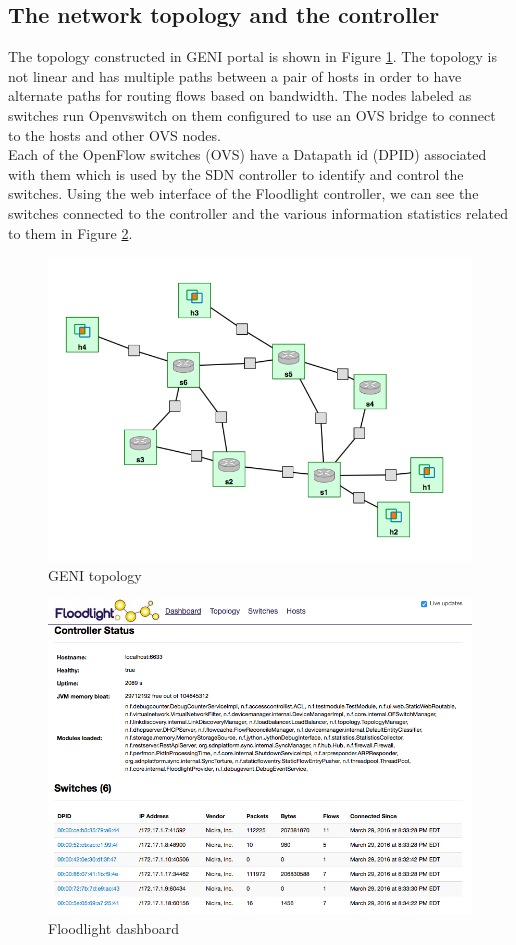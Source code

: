 \documentclass[paper=a4, fontsize=12pt]{scrartcl}	%
\numberwithin{equation}{section}		%
\numberwithin{figure}{section}			%
\numberwithin{table}{section}				%
\begin{document}
\subsection{The network topology and the controller}
The topology constructed in GENI portal is shown in Figure \ref{Fig 4.1}. The topology is not linear and has multiple paths between a pair of hosts in order to have alternate paths for routing flows based on bandwidth. The nodes labeled as switches run Openvswitch on them configured to use an OVS bridge to connect to the hosts and other OVS nodes.
\\
Each of the OpenFlow switches (OVS) have a Datapath id (DPID) associated with them which is used by the SDN controller to identify and control the switches. Using the web interface of the Floodlight controller, we can see the switches connected to the controller and the various information statistics related to them in Figure \ref{Fig 4.2}.
\begin{figure}[H]
\begin{center}
\includegraphics[scale=0.4]{topology.png}   
\end{center}
 \caption{GENI topology}
 \label{Fig 4.1}
\end{figure}
\begin{figure}[H]
\begin{center}
\includegraphics[scale=0.45]{floodlight.png}   
\end{center}
 \caption{Floodlight dashboard}
 \label{Fig 4.2}
\end{figure}
\end{document}
